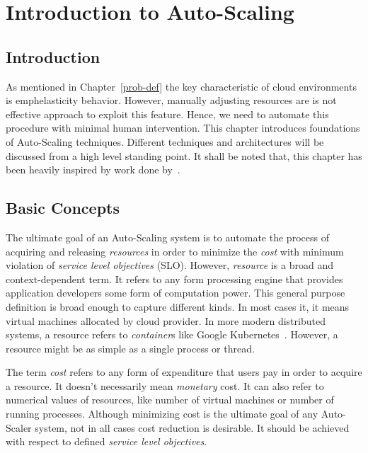 \chapter{Introduction to Auto-Scaling}
\label{intro-auto-scale}

\section{Introduction}
\label{ias:intro}

As mentioned in Chapter~\ref{prob-def} the key characteristic of cloud environments is emph{elasticity} behavior. However, manually adjusting resources are is not effective approach to exploit this feature. Hence, we need to automate this procedure with minimal human intervention. This chapter introduces foundations of Auto-Scaling techniques. Different techniques and architectures will be discussed from a high level standing point. It shall be noted that, this chapter has been heavily inspired by work done by~\textcite{Lorido-Botran2014}.

\section{Basic Concepts}
\label{ias:basics}

The ultimate goal of an Auto-Scaling system is to automate the process of acquiring and releasing \emph{resources} in order to minimize the \emph{cost} with minimum violation of \emph{service level objectives} (SLO). However, \emph{resource} is a broad and context-dependent term. It refers to any form processing engine that provides application developers some form of computation power. This general purpose definition is broad enough to capture different kinds. In most cases it, it means virtual machines allocated by cloud provider. In more modern distributed systems, a resource refers to \emph{container}s like Google Kubernetes~\cite{kuber}. However, a resource might be as simple as a single process or thread.

The term \emph{cost} refers to any form of expenditure that users pay in order to acquire a resource. It doesn't necessarily mean \emph{monetary} cost. It can also refer to numerical values of resources, like number of virtual machines or number of running processes. Although minimizing cost is the ultimate goal of any Auto-Scaler system, not in all cases cost reduction is desirable. It should be achieved with respect to defined \emph{service level objectives}.

